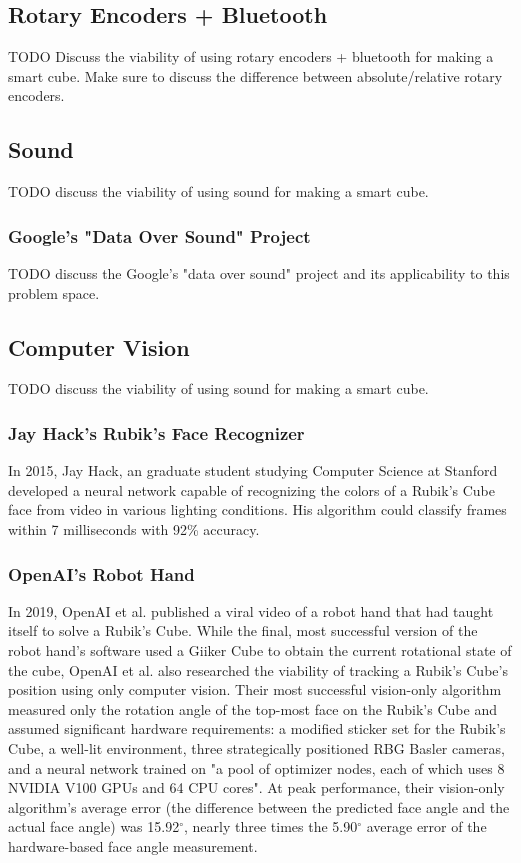 \subsection{Rotary Encoders + Bluetooth}
TODO Discuss the viability of using rotary encoders + bluetooth for making a smart cube. Make sure to discuss the difference between absolute/relative rotary encoders.


\subsection{Sound}
TODO discuss the viability of using sound for making a smart cube.

\subsubsection{Google's "Data Over Sound" Project}
TODO discuss the Google's "data over sound" project and its applicability to this problem space.


\subsection{Computer Vision}
TODO discuss the viability of using sound for making a smart cube.

\subsubsection{Jay Hack's Rubik's Face Recognizer}
In 2015, Jay Hack, an graduate student studying Computer Science at Stanford developed a neural network capable of recognizing the colors of a Rubik's Cube face from video in various lighting conditions.
His algorithm could classify frames within 7 milliseconds with 92\% accuracy. \cite{jay-hack-opencv}

\subsubsection{OpenAI's Robot Hand}
In 2019, OpenAI et al. published a viral video of a robot hand that had taught itself to solve a Rubik's Cube.
While the final, most successful version of the robot hand's software used a Giiker Cube to obtain the current rotational state of the cube, OpenAI et al. also researched the viability of tracking a Rubik's Cube's position using only computer vision.
Their most successful vision-only algorithm measured only the rotation angle of the top-most face on the Rubik's Cube and assumed significant hardware requirements: a modified sticker set for the Rubik's Cube, a well-lit environment, three strategically positioned RBG Basler cameras, and a neural network trained on "a pool of optimizer nodes, each of which uses 8 NVIDIA V100 GPUs and 64 CPU cores".
At peak performance, their vision-only algorithm's average error (the difference between the predicted face angle and the actual face angle) was 15.92$^\circ$, nearly three times the 5.90$^\circ$ average error of the hardware-based face angle measurement. \cite{openai2019rubiks}

